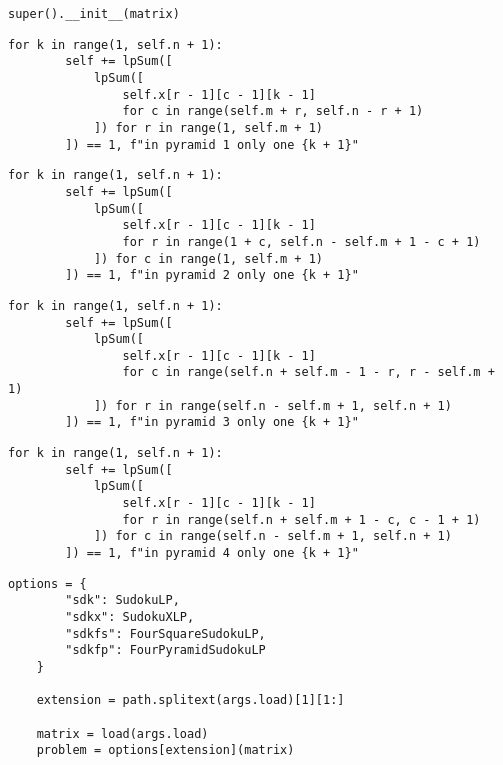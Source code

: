 \documentclass[12pt]{article}
\begin{document}
\begin{lstlisting}[caption={Initializing the \textbf{SudokuLP}} super class]
    super().__init__(matrix)
\end{lstlisting}

\begin{lstlisting}[caption={Declaring that there should only be one \textit{k} in the first pyramid-shaped pyramid region}]
    for k in range(1, self.n + 1):
        self += lpSum([
            lpSum([
                self.x[r - 1][c - 1][k - 1]
                for c in range(self.m + r, self.n - r + 1)
            ]) for r in range(1, self.m + 1)
        ]) == 1, f"in pyramid 1 only one {k + 1}"
\end{lstlisting}

\begin{lstlisting}[caption={Declaring that there should only be one \textit{k} in the second pyramid-shaped pyramid region}]
    for k in range(1, self.n + 1):
        self += lpSum([
            lpSum([
                self.x[r - 1][c - 1][k - 1]
                for r in range(1 + c, self.n - self.m + 1 - c + 1)
            ]) for c in range(1, self.m + 1)
        ]) == 1, f"in pyramid 2 only one {k + 1}"
\end{lstlisting}

\pagebreak

\begin{lstlisting}[caption={Declaring that there should only be one \textit{k} in the third pyramid-shaped pyramid region}]
    for k in range(1, self.n + 1):
        self += lpSum([
            lpSum([
                self.x[r - 1][c - 1][k - 1]
                for c in range(self.n + self.m - 1 - r, r - self.m + 1)
            ]) for r in range(self.n - self.m + 1, self.n + 1)
        ]) == 1, f"in pyramid 3 only one {k + 1}"
\end{lstlisting}

\begin{lstlisting}[caption={Declaring that there should only be one \textit{k} in the fourth pyramid-shaped pyramid region}]
    for k in range(1, self.n + 1):
        self += lpSum([
            lpSum([
                self.x[r - 1][c - 1][k - 1]
                for r in range(self.n + self.m + 1 - c, c - 1 + 1)
            ]) for c in range(self.n - self.m + 1, self.n + 1)
        ]) == 1, f"in pyramid 4 only one {k + 1}"
\end{lstlisting}

\begin{lstlisting}[caption={Example Usage}]
    options = {
        "sdk": SudokuLP,
        "sdkx": SudokuXLP,
        "sdkfs": FourSquareSudokuLP,
        "sdkfp": FourPyramidSudokuLP
    }

    extension = path.splitext(args.load)[1][1:]

    matrix = load(args.load)
    problem = options[extension](matrix)
\end{lstlisting}
\end{document}
